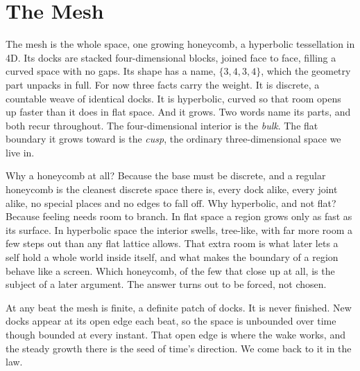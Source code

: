 \section{The Mesh}

The mesh is the whole space, one growing honeycomb, a hyperbolic tessellation in 4D. Its docks are stacked four-dimensional blocks, joined face to face, filling a curved space with no gaps. Its shape has a name, $\{3,4,3,4\}$, which the geometry part unpacks in full. For now three facts carry the weight. It is discrete, a countable weave of identical docks. It is hyperbolic, curved so that room opens up faster than it does in flat space. And it grows. Two words name its parts, and both recur throughout. The four-dimensional interior is the \emph{bulk}. The flat boundary it grows toward is the \emph{cusp}, the ordinary three-dimensional space we live in.

Why a honeycomb at all? Because the base must be discrete, and a regular honeycomb is the cleanest discrete space there is, every dock alike, every joint alike, no special places and no edges to fall off. Why hyperbolic, and not flat? Because feeling needs room to branch. In flat space a region grows only as fast as its surface. In hyperbolic space the interior swells, tree-like, with far more room a few steps out than any flat lattice allows. That extra room is what later lets a self hold a whole world inside itself, and what makes the boundary of a region behave like a screen. Which honeycomb, of the few that close up at all, is the subject of a later argument. The answer turns out to be forced, not chosen.

At any beat the mesh is finite, a definite patch of docks. It is never finished. New docks appear at its open edge each beat, so the space is unbounded over time though bounded at every instant. That open edge is where the wake works, and the steady growth there is the seed of time's direction. We come back to it in the law.
